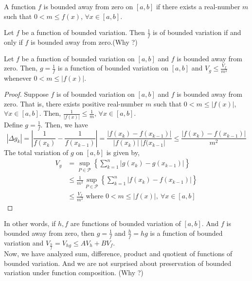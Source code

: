 \begin{definition}
	A function $f$ is bounded away from zero on $[a,b]$ if there exists a real-number $m$ such that $0 < m \le f(x)$, $\forall x \in [a,b]$.
\end{definition}

\begin{commentary}
	Let $f$ be a function of bounded variation.
	Then $\frac{1}{f}$ is of bounded variation if and only if $f$ is bounded away from zero.(Why ?)
\end{commentary}

\begin{theorem}
	Let $f$ be a function of bounded variation on $[a,b]$ and $f$ is bounded away from zero.
	Then, $g = \frac{1}{f}$ is a function of bounded variation on $[a,b]$ and $V_g \le \frac{V_f}{m^2}$ whenever $0 < m \le |f(x)|$.
\end{theorem}
\begin{proof}
	Suppose $f$ is of bounded variation on $[a,b]$ and $f$ is bounded away from zero.
	That is, there exists positive real-number $m$ such that $0 < m \le |f(x)|$, $\forall x \in [a,b]$.
	Then, $\frac{1}{|f(x)|} \le \frac{1}{m}$, $\forall x \in [a,b]$.\\

	Define $g = \frac{1}{f}$.
	Then, we have
	\[ |\Delta g_k| = \left| \frac{1}{f(x_k)} - \frac{1}{f(x_{k-1})} \right| = \frac{|f(x_k)-f(x_{k-1})|}{|f(x_k)|\ |f(x_{k-1}|} \le \frac{|f(x_k)-f(x_{k-1})|}{m^2} \]
	The total variation of $g$ on $[a,b]$ is given by,
	\begin{align*}
	V_g 
		& = \sup_{P \in \mathscr{P}} \left\{ \sum_{k=1}^n |g(x_k)-g(x_{k-1})| \right\} \\
		& \le \frac{1}{m^2} \sup_{P \in \mathscr{P}} \left\{ \sum_{k=1}^n |f(x_k)-f(x_{k-1})| \right\} \\
		& \le \frac{V_f}{m^2} \text{ where } 0 < m \le |f(x)|,\ \forall x \in [a,b]
	\end{align*}
\end{proof}
\begin{commentary}
	In other words, if $h,f$ are functions of bounded variation of $[a,b]$.
	And $f$ is bounded away from zero, then $g = \frac{1}{f}$ and $\frac{h}{f} = hg$ is a function of bounded variation and $V_{\frac{h}{f}} = V_{hg} \le AV_h + BV_f$.\\

	Now, we have analyzed sum, difference, product and quotient of functions of bounded variation.
	And we are not surprised about preservation of bounded variation under function composition. (Why ?)
\end{commentary}
